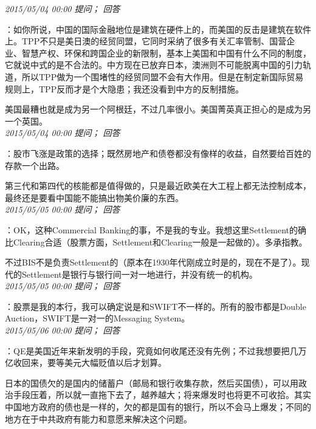 \documentclass[twocolumn]{ctexart}
\begin{document}
\textit{\hfill\noindent\small 2015/05/04 00:00 提问； 回答}

：如你所说，中国的国际金融地位是建筑在硬件上的，而美国的反击是建筑在软件上。TPP不只是美日澳的经贸同盟，它同时采纳了很多有关汇率管制、国营企业、智慧产权、环保和跨国企业的新限制，基本上美国和中国有什么不同的制度，它就说中式的是不合法的。中方现在已放弃日本，澳洲则不可能脱离中国的引力轨道，所以TPP做为一个围堵性的经贸同盟不会有大作用。但是在制定新国际贸易规则上，TPP反而才是个大隐患；我还没看到中方的反制措施。

美国最糟也就是成为另一个阿根廷，不过几率很小。美国菁英真正担心的是成为另一个英国。\\

\textit{\hfill\noindent\small 2015/05/04 00:00 提问； 回答}

：股市飞涨是政策的选择；既然房地产和债卷都没有像样的收益，自然要给百姓的存款一个出路。

第三代和第四代的核能都是值得做的，只是最近欧美在大工程上都无法控制成本，最终还是要看中国能不能搞出物美价廉的东西。\\

\textit{\hfill\noindent\small 2015/05/05 00:00 提问； 回答}

：OK，这种Commercial Banking的事，不是我的专业。我想这里Settlement的确比Clearing合适（股票方面，Settlement和Clearing一般是一起做的）。多承指教。

不过BIS不是负责Settlement的（原本在1930年代刚成立时是的，现在不是了）。现代的Settlement是银行与银行间一对一地进行，并没有统一的机构。\\

\textit{\hfill\noindent\small 2015/05/05 00:00 提问； 回答}

：股票是我的本行，我可以确定说是和SWIFT不一样的。所有的股市都是Double Auction，SWIFT是一对一的Messaging System。\\

\textit{\hfill\noindent\small 2015/05/06 00:00 提问； 回答}

：QE是美国近年来新发明的手段，究竟如何收尾还没有先例；不过我想要把几万亿收回来，要等美元大幅贬值以后才划算。

日本的国债欠的是国内的储蓄户（邮局和银行收集存款，然后买国债），可以用政治手段压着，所以就一直拖下去了，越养越大；将来爆发时也将更不可收拾。其实中国地方政府的债也是一样的，欠的都是国有的银行，所以不会马上爆发；不同的地方在于中共政府有能力和意愿来解决这个问题。\\
\end{document}
